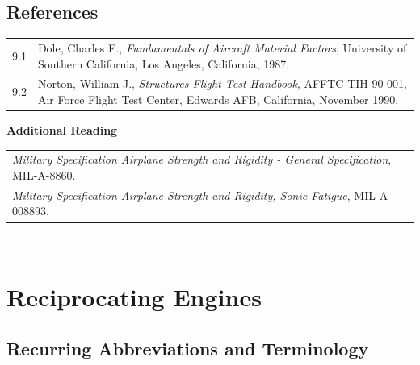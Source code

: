 \documentclass[
]{book}
\begin{document}
\hypertarget{references-7}{%
\section{References}\label{references-7}}

\begin{longtable}[]{@{}ll@{}}
\toprule
\endhead
\begin{minipage}[t]{0.06\columnwidth}\raggedright
9.1\strut
\end{minipage} & \begin{minipage}[t]{0.88\columnwidth}\raggedright
Dole, Charles E., \emph{Fundamentals of Aircraft Material Factors}, University of Southern California, Los Angeles, California, 1987.\strut
\end{minipage}\tabularnewline
\begin{minipage}[t]{0.06\columnwidth}\raggedright
9.2\strut
\end{minipage} & \begin{minipage}[t]{0.88\columnwidth}\raggedright
Norton, William J., \emph{Structures Flight Test Handbook}, AFFTC-TIH-90-001, Air Force Flight Test Center, Edwards AFB, California, November 1990.\strut
\end{minipage}\tabularnewline
\bottomrule
\end{longtable}

\textbf{Additional Reading}

\begin{longtable}[]{@{}l@{}}
\toprule
\endhead
\begin{minipage}[t]{0.97\columnwidth}\raggedright
\emph{Military Specification Airplane Strength and Rigidity - General Specification}, MIL-A-8860.\strut
\end{minipage}\tabularnewline
\begin{minipage}[t]{0.97\columnwidth}\raggedright
\emph{Military Specification Airplane Strength and Rigidity, Sonic Fatigue}, MIL-A-008893.\strut
\end{minipage}\tabularnewline
\bottomrule
\end{longtable}

~

\hypertarget{reciprocating-engines}{%
\chapter{Reciprocating Engines}\label{reciprocating-engines}}

\hypertarget{recurring-abbreviations-and-terminology}{%
\section{Recurring Abbreviations and Terminology}\label{recurring-abbreviations-and-terminology}}
\end{document}
